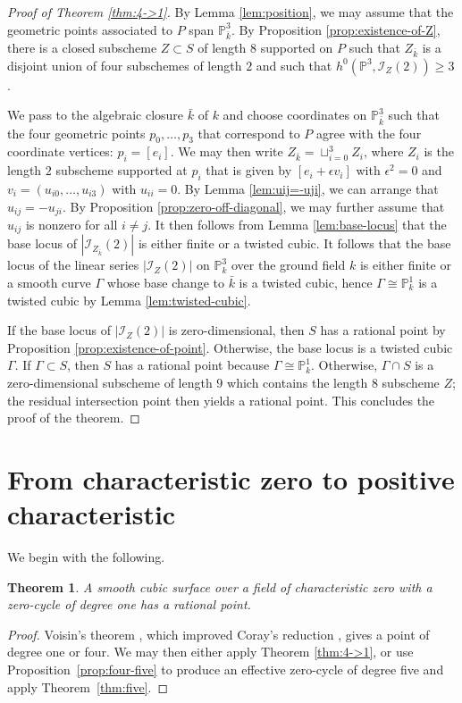 \documentclass[a4paper,11pt]{amsart}
\numberwithin{equation}{section}
\newtheorem{theorem}{Theorem}[section]
\theoremstyle{definition}
\theoremstyle{remark}
\newcommand{\PP}{\mathbb P}
\newcommand{\CP}{\PP}
\begin{document}
\begin{proof}[Proof of Theorem \ref{thm:4->1}]
By Lemma \ref{lem:position}, we may assume that the geometric points associated to $P$ span $\PP^3_{\bar k}$.
By Proposition \ref{prop:existence-of-Z}, there is a closed subscheme $Z\subset S$ of length $8$ supported on $P$ such that $Z_{\bar k}$ is a disjoint union of four subschemes of length $2$ and such that $h^0(\CP^3,\mathcal I_Z(2))\geq 3$.

We pass to the algebraic closure $\bar k$ of $k$ and choose coordinates on $\CP^3_{\bar k}$ such that the four geometric points $p_0,\dots ,p_3$ that correspond to $P$ agree with the four coordinate vertices: $p_i=[e_i]$.
We may then write $Z_{\bar k}=\sqcup_{i=0}^3Z_i$, where $Z_i$ is the length $2$ subscheme supported at $p_i$ that is given by $[e_i+\epsilon v_i]$ with $\epsilon^2=0$ and $v_i=(u_{i0},\dots,u_{i3})$ with $u_{ii}=0$.
By Lemma \ref{lem:uij=-uji}, we can arrange that $u_{ij}=-u_{ji}$.
By Proposition \ref{prop:zero-off-diagonal}, we may further assume that $u_{ij}$ is nonzero for all $i\neq j$.
It then follows from Lemma \ref{lem:base-locus} that the base locus of $|\mathcal I_{Z_{\bar k}}(2)|$ is either finite or a twisted cubic.
It follows that the base locus of the linear series $|\mathcal I_{Z}(2)|$ on $\CP^3_k$ over the ground field $k$ is either finite or a smooth curve $\Gamma$ whose base change to $\bar k$ is a twisted cubic, hence $\Gamma\cong \CP^1_k$ is a twisted cubic by Lemma \ref{lem:twisted-cubic}.


If the base locus of $|\mathcal I_Z(2)|$ is zero-dimensional, then $S$ has a rational point by Proposition \ref{prop:existence-of-point}.
Otherwise, the base locus is a twisted cubic $\Gamma$. 
If $\Gamma\subset S$, then $S$ has a rational point because $\Gamma\cong \CP_k^1$.
Otherwise, $\Gamma\cap S$ is a zero-dimensional subscheme of length $9$ which contains the length $8$ subscheme $Z$; the residual intersection point then yields a rational point.
This concludes the proof of the theorem.
\end{proof} 

\section{From characteristic zero to positive characteristic}\label{sec:specialization}

We begin with the following.

\begin{theorem}\label{thm:charzero}
A smooth cubic surface over a field of characteristic zero with a
zero-cycle of degree one has a rational point.
\end{theorem}
\begin{proof}
Voisin's theorem \cite[Theorem~1.5]{voisin-coray}, which improved 
Coray's reduction \cite[Theorem 7.1]{coray},
gives a point of degree one or four. 
We may then either apply Theorem \ref{thm:4->1}, or
use Proposition~\ref{prop:four-five} to produce 
an effective zero-cycle of degree five and apply 
Theorem~\ref{thm:five}.
\end{proof}
\end{document}
